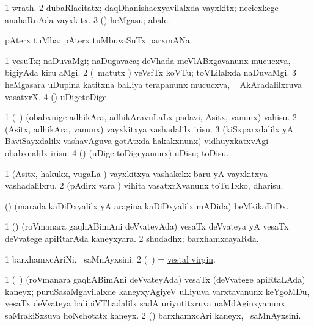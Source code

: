 \noindent 
\gl{\pagu}
\expl{}
\bmng
\bnum
\num{1}  \hyperref{kandict_w.pdf}{W}{wrath pagu(2)}{wrath}. 
\num{2}  dubaRlacitatx; daqDhanishacxyavilalxda vayxkitx; necicxkege anahaRnAda vayxkitx. 
\num{3}  (\beY) heMgasu; abale. 
\enum
\emng
\eentry

\bentry 
{} 
\gl{\nA}
\expl{}
\bmng
 pAterx tuMba; pAterx tuMbuvaSuTx parxmANa. 
\emng
\eentry

\bentry
{} 
\gl{\nA}
\bmng
{} 
\bnum
\num{1} vesuTx; naDuvaMgi; naDugavaca; deVhada meVlABxgavanunx mucucxva, bigiyAda kiru aMgi.  
\num{2} (\AseTxrXV\ matutx \ame) veVsfTx koVTu; toVLilalxda naDuvaMgi. 
\hypertarget{vest(1)3}{} 
\num{3} heMgasara uDupina katitxna baLiya terapanunx mucucxva, \sA\  AkAradalilxruva vasatxrX. 
\num{4} (\pArxparx) uDigetoDige. 
\enum
\emng
\eentry

\bentry
{} 
\gl{\sakirx}
\expl{}
\bmng
\bnum
\num{1} (\kanmu\ \kaparx) (obabxnige adhikAra, adhikAravuLaLx padavi, Asitx, \mo vanunx) vahisu. 
\num{2} (Asitx, adhikAra, \mo vanunx) vayxkitxya vashadalilx irisu. 
\num{3} (kiSxparxdalilx yA BaviSayxdalilx vashavAguva gotAtxda hakakxnunx) vidhuyxkatxvAgi obabxnalilx irisu. 
\num{4} (\kAparx) (uDige toDigeyanunx) uDisu; toDisu. 
\enum
\emng

\noindent 
\gl{\akirx}
\expl{}
\bmng
\bnum
\num{1} (Asitx, hakukx, \mo vugaLa \vi) vayxkitxya vashakekx baru yA vayxkitxya vashadalilxru. 
\num{2} (pAdirx \mo vara \vi) vihita vasatxrXvanunx toTuTxko, dharisu. 
\enum
\emng
\eentry

\bentry
{} 
\gl{\nA}
\expl{}
\bmng
 (\ca) (marada kaDiDxyalilx yA aragina kaDiDxyalilx mADida) beMkikaDiDx. 
\emng
\eentry

\bentry
{} 
\gl{\gu}
\expl{}
\bmng
\bnum
\num{1} (\roVpu) (roVmanara gaqhABimAni deVvateyAda) vesaTx deVvateya yA vesaTx deVvatege apiRtarAda kaneyxyara. 
\num{2} shudadhx; barxhamxcayaRda. 
\enum
\emng
\eentry

\bentry
{} 
\gl{\nA}
\expl{}
\bmng
\bnum
\num{1} barxhamxcAriNi, \kanmu\ saMnAyxsini. 
\num{2} (\roV\ \pArxkatx) = \hyperlink{vestal virgin}{vestal virgin}. 
\enum
\emng
\eentry

\bentry
{}
\gl{\nA}
\expl{}
\bmng
\bnum
\num{1} (\roV\ \pArxkatx) (roVmanara gaqhABimAni deVvateyAda) vesaTx (deVvatege apiRtaLAda) kaneyx; puruSasaMgavilalxde kaneyxyAgiyeV uLiyuva varxtavanunx keYgoMDu, vesaTx deVvateya balipiVThadalilx sadA uriyutitxruva naMdAginxyanunx saMrakiSxsuva hoNehotatx kaneyx. 
\num{2} (\rUpa) barxhamxcAri kaneyx, \kanmu\ saMnAyxsini. 
\enum
\emng
\eentry

